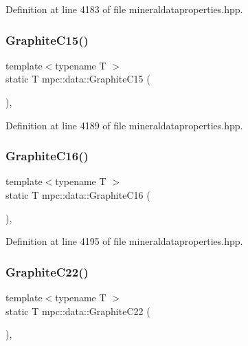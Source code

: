 Definition at line 4183 of file mineraldataproperties.\+hpp.

\mbox{\label{namespacempc_1_1data_a7d8d8923cd6ddca415da2911dd6d519e}} 
\subsubsection{\texorpdfstring{Graphite\+C15()}{GraphiteC15()}}
{\footnotesize\ttfamily template$<$typename T $>$ \\
static T mpc\+::data\+::\+Graphite\+C15 (\begin{DoxyParamCaption}{ }\end{DoxyParamCaption})\hspace{0.3cm}{\ttfamily [inline]}, {\ttfamily [static]}}



Definition at line 4189 of file mineraldataproperties.\+hpp.

\mbox{\label{namespacempc_1_1data_ac743d41f62cbd74047f13192ce87c307}} 
\subsubsection{\texorpdfstring{Graphite\+C16()}{GraphiteC16()}}
{\footnotesize\ttfamily template$<$typename T $>$ \\
static T mpc\+::data\+::\+Graphite\+C16 (\begin{DoxyParamCaption}{ }\end{DoxyParamCaption})\hspace{0.3cm}{\ttfamily [inline]}, {\ttfamily [static]}}



Definition at line 4195 of file mineraldataproperties.\+hpp.

\mbox{\label{namespacempc_1_1data_af3e827952f3b75b2daf52a80fc24f29a}} 
\subsubsection{\texorpdfstring{Graphite\+C22()}{GraphiteC22()}}
{\footnotesize\ttfamily template$<$typename T $>$ \\
static T mpc\+::data\+::\+Graphite\+C22 (\begin{DoxyParamCaption}{ }\end{DoxyParamCaption})\hspace{0.3cm}{\ttfamily [inline]}, {\ttfamily [static]}}



